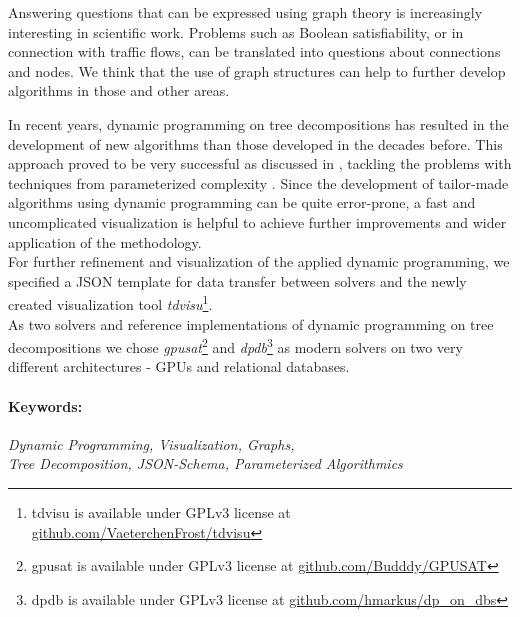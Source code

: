 \documentclass[a4paper, 12pt, bibliography=totoc]{scrartcl}
\begin{document}
Answering questions that can be expressed using graph theory is increasingly interesting in scientific work.
Problems such as Boolean satisfiability, or in connection with traffic flows, can be translated into questions about connections and nodes.
We think that the use of graph structures can help to further develop algorithms in those and other areas.

In recent years, dynamic programming on tree decompositions has resulted in the development of new algorithms than those developed in the decades before. This approach proved to be very successful as discussed in \cite{fichtegpusat2}, tackling the problems with techniques from parameterized complexity \cite[page 2]{dpdbpadl2020}.
Since the development of tailor-made algorithms using dynamic programming can be quite error-prone, a fast and uncomplicated visualization is helpful to achieve further improvements and wider application of the methodology.\\

For further refinement and visualization of the applied dynamic programming,
we specified a JSON template for data transfer between solvers and the newly created visualization tool \textit{tdvisu}\footnote{tdvisu is available under GPLv3 license at \url{github.com/VaeterchenFrost/tdvisu}}.\\

As two solvers and reference implementations of dynamic programming on tree decompositions we chose \textit{gpusat}\footnote{gpusat is available under GPLv3 license at \url{github.com/Budddy/GPUSAT}} and \textit{dpdb}\footnote{dpdb is available under GPLv3 license at \url{github.com/hmarkus/dp\_on\_dbs}} as modern solvers on two very different architectures - GPUs and relational databases.\\


\paragraph{Keywords:}
\textit{Dynamic Programming, Visualization, Graphs, \\
Tree Decomposition, JSON-Schema, Parameterized Algorithmics 
}\leftskip=1.6cm \rightskip=1cm

\leftskip=0pt\rightskip=0pt


{%
	\newpage
	
\tableofcontents
}

\newpage
\end{document}
